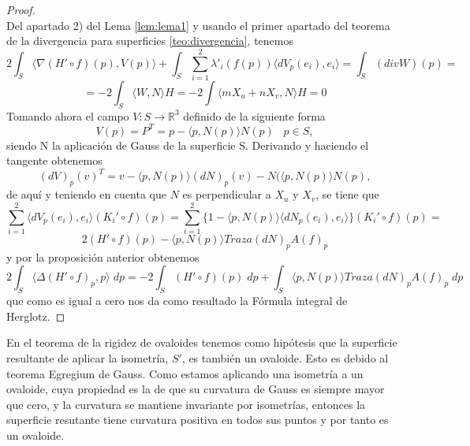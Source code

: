 \begin{proof}
	${ }$\\
	
Del apartado 2) del Lema \ref{lem:lema1} y usando el primer apartado del teorema de la divergencia para superficies \ref{teo:divergencia}, tenemos
${ }$\\
\[
	2 \int_S \langle \nabla (H' \circ f)(p), V(p) \rangle + \int_S \sum_{i=1}^{2} \lambda'_{i}(f(p)) \langle dV_p(e_i), e_i \rangle = \int_S (div W)(p) = 
\]
\[
	= -2 \int_S \langle W, N \rangle H = -2 \int \langle mX_u + nX_v, N \rangle H = 0
\]
${ }$\\

Tomando ahora el campo $V : S \to \mathbb{R}^3$ definido de la siguiente forma
${ }$\\
\[
	V(p) = P^T = p - \langle p, N(p) \rangle N(p) \;\;\; p \in S,
\]
${ }$\\
siendo N la aplicación de Gauss de la superficie S. Derivando y haciendo el tangente obtenemos
${ }$\\
\[
	(dV)_p(v)^T = v - \langle p, N(p) \rangle (dN)_p(v) -N(\langle p, N(p) \rangle N(p),
\]
${ }$\\
de aquí y teniendo en cuenta que $N$ es perpendicular a $X_u$ y $X_v$, se tiene que
${ }$\\
\[
	\sum^{2}_{i=1} \langle dV_p (e_i), e_i \rangle (K_{i}' \circ f)(p) = \sum^{2}_{i=1} \{ 1 - \langle p, N(p) \rangle \langle dN_p(e_i), e_i \rangle \} (K_{i}' \circ f)(p) = 
\]
\[
	2 (H' \circ f)(p) - \langle p, N(p) \rangle Traza (dN)_p A(f)_p
\]
${ }$\\
y por la proposición anterior obtenemos
${ }$\\
\[
	2 \int_S \langle \Delta (H' \circ f)_p, p \rangle \; dp = -2 \int_S (H' \circ f)(p) \; dp + \int_S \langle p, N(p) \rangle Traza (dN)_p A(f)_p \; dp
\]
${ }$\\
que como es igual a cero nos da como resultado la Fórmula integral de Herglotz.
\end{proof}
${ }$\\



En el teorema de la rigidez de ovaloides tenemos como hipótesis que la superficie resultante de aplicar la isometría, $S'$, es también un ovaloide. Esto es debido al teorema Egregium de Gauss. Como estamos aplicando una isometría a un ovaloide, cuya propiedad es la de que su curvatura de Gauss es siempre mayor que cero, y la curvatura se mantiene invariante por isometrías, entonces la superficie resutante tiene curvatura positiva en todos sus puntos y por tanto es un ovaloide.
${ }$\\

